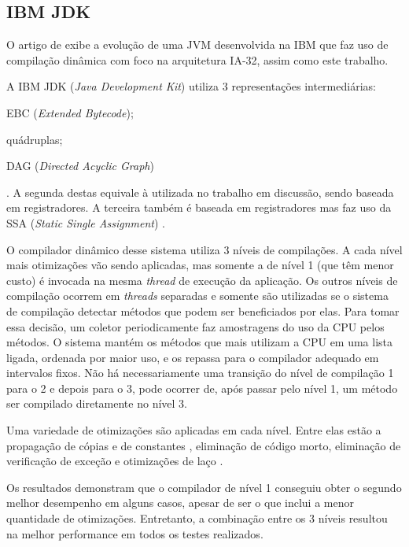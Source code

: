 \subsection{IBM JDK}

O artigo de  exibe a evolução
de uma JVM desenvolvida na IBM que faz uso de compilação dinâmica com
foco na arquitetura IA-32, assim como este trabalho.

A IBM JDK (\textit{Java Development Kit}) utiliza 3 representações
intermediárias: \begin{inparaenum}[(1)] \item EBC
(\textit{Extended Bytecode}); \item
quádruplas; \item DAG (\textit{Directed Acyclic Graph})\end{inparaenum}.
A segunda destas equivale à utilizada no trabalho
em discussão, sendo baseada em registradores. A terceira também é
baseada em registradores mas faz uso da SSA (\textit{Static Single
  Assignment}) \cite{cytron}.

O compilador dinâmico desse sistema utiliza 3 níveis de compilações. A
cada nível mais otimizações vão sendo aplicadas, mas somente a de
nível 1 (que têm menor custo) é invocada na mesma \textit{thread} de
execução da aplicação. Os outros níveis de compilação ocorrem em
\textit{threads} separadas e somente são utilizadas se o sistema
de compilação detectar métodos que podem ser beneficiados por
elas. Para tomar essa decisão, um coletor periodicamente faz
amostragens do uso da CPU pelos métodos. O sistema mantém os métodos
que mais utilizam a CPU em uma lista ligada, ordenada por maior uso, e
os repassa para o compilador adequado em intervalos fixos. Não há
necessariamente uma transição do nível de compilação 1 para o 2 e
depois para o 3, pode ocorrer de, após passar pelo nível 1, um método
ser compilado diretamente no nível 3.

Uma variedade de otimizações são aplicadas em cada nível. Entre elas
estão a propagação de cópias e de constantes \cite{optconstprog},
eliminação de código morto,
eliminação de verificação de exceção \cite{optelimverifcexec} e
otimizações de laço \cite{muchnick}.

Os resultados demonstram que o compilador de nível 1 conseguiu obter o
segundo melhor desempenho em alguns casos, apesar de ser o que inclui
a menor quantidade de otimizações. Entretanto, a combinação entre os 3
níveis resultou na melhor performance em todos os testes realizados.

